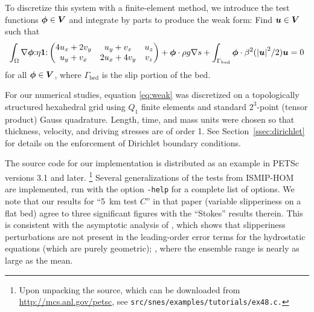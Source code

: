 To discretize this system with a finite-element method, we introduce the test functions $\bm \phi
\in \bm V$ and integrate by parts to produce the weak form: Find $\bm u \in \bm V$ such that
\begin{align}\label{eq:weak}
  \int_\Omega \nabla\bm\phi { : } \eta \bm 1 { : }
  \begin{pmatrix}
    4 u_x + 2 v_y & u_y + v_x & u_z \\
    u_y + v_x & 2 u_x + 4 v_y & v_z
  \end{pmatrix} + \bm\phi \cdot\rho g \nabla s
  + \int_{\Gamma_{\text{bed}}} \bm \phi \cdot \beta^2({\left\lvert \bm u \right\rvert}^2/2) \bm u = 0
\end{align}
for all $\bm \phi \in \bm V$, where $\Gamma_{\text{bed}}$ is the slip portion of the bed.

For our numerical studies, equation \eqref{eq:weak} was discretized on a topologically structured hexahedral grid using $Q_1$ finite elements and standard $2^3$-point (tensor product) Gauss quadrature.  Length, time, and mass units were chosen so that thickness, velocity, and driving stresses are of order 1.  See Section~\ref{ssec:dirichlet} for details on the enforcement of Dirichlet boundary conditions.

The source code for our implementation is distributed as an example in PETSc~\citep{petsc-web-page} versions 3.1 and later.
\footnote{
Upon unpacking the source, which can be downloaded from \url{http://mcs.anl.gov/petsc}, see \texttt{src/snes/examples/tutorials/ex48.c.}
}
Several generalizations of the tests from ISMIP-HOM~\citep{pattyn2008beh} are implemented, run with the option \texttt{-help} for a complete list of options.
We note that our results for ``\SI{5}{\kilo\metre} test $C$'' in that paper (variable slipperiness on a flat bed) agree to three significant figures with the ``Stokes'' results therein.
This is consistent with the asymptotic analysis of \citet{schoof2010thin}, which shows that slipperiness perturbations are not present in the leading-order error terms for the hydrostatic equations (which are purely geometric); \cf \citet[Table~4 and Figure~8]{pattyn2008beh}, where the ensemble range is nearly as large as the mean.


